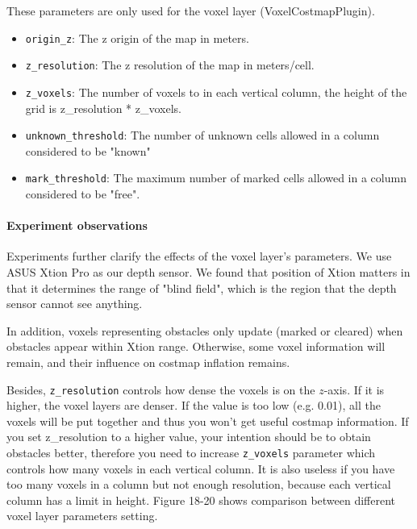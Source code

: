 \documentclass[12pt]{article}
\begin{document}
These parameters are only used for the voxel layer (VoxelCostmapPlugin).

\begin{itemize}
\item \texttt{origin\_z}: The z origin of the map in meters.
\item \texttt{z\_resolution}: The z resolution of the map in meters/cell.
\item \texttt{z\_voxels}: The number of voxels to in each vertical column, the height of the grid is z\_resolution * z\_voxels.
\item \texttt{unknown\_threshold}: The number of unknown cells allowed in a column considered to be "known"
\item \texttt{mark\_threshold}: The maximum number of marked cells allowed in a column considered to be "free".
\end{itemize}

\paragraph{Experiment observations} Experiments further clarify the effects of the voxel layer's parameters.  We use ASUS Xtion Pro as our depth sensor. We found that position of Xtion matters in that it determines the range of "blind field", which is the region that the depth sensor cannot see anything. 

In addition, voxels representing obstacles only update (marked or cleared) when obstacles appear within Xtion range. Otherwise, some voxel information will remain, and their influence on costmap inflation remains. 

Besides, \texttt{z\_resolution} controls how dense the voxels is on the $z$-axis. If it is higher, the voxel layers are denser. If the value is too low (e.g. 0.01), all the voxels will be put together and thus you won't get useful costmap information. If you set z\_resolution to a higher value, your intention should be to obtain obstacles better, therefore you need to increase \texttt{z\_voxels} parameter which controls how many voxels in each vertical column. It is also useless if you have too many voxels in a column but not enough resolution, because each vertical column has a limit in height. Figure 18-20 shows comparison between different voxel layer parameters setting.

\begin{figure}[!h]
\end{figure}
\end{document}
